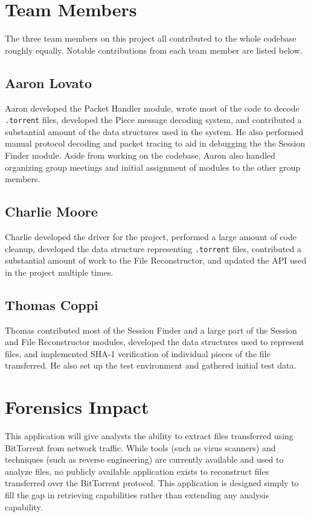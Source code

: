 \documentclass{acm_proc_article-sp}
\begin{document}
\section{Team Members}
The three team members on this project all contributed to the whole codebase
roughly equally. Notable contributions from each team member are listed below.

\subsection{Aaron Lovato}
Aaron developed the Packet Handler module, wrote most of the code to decode
\texttt{.torrent} files, developed the Piece message decoding system, and
contributed a substantial amount of the data structures used in the system. He
also performed manual protocol decoding and packet tracing to aid in debugging
the the Session Finder module. Aside from working on the codebase, Aaron also
handled organizing group meetings and initial assignment of modules to the other
group members.

\subsection{Charlie Moore}
Charlie developed the driver for the project, performed a large amount of code
cleanup, developed the data structure representing \texttt{.torrent} files,
contributed a substantial amount of work to the File Reconstructor, and updated
the API used in the project multiple times.

\subsection{Thomas Coppi}
Thomas contributed most of the Session Finder and a large part of the Session
and File Reconstructor modules, developed the data structures used to represent
files, and implemented SHA-1 verification of individual pieces of the file
transferred.  He also set up the test environment and gathered initial test
data.

\section{Forensics Impact}
This application will give analysts the ability to extract files transferred
using BitTorrent from network traffic. While tools (such as virus scanners) and
techniques (such as reverse engineering) are currently available and used to
analyze files, no publicly available application exists to reconstruct files
transferred over the BitTorrent protocol. This application is designed simply to
fill the gap in retrieving capabilities rather than extending any analysis
capability.
\end{document}
